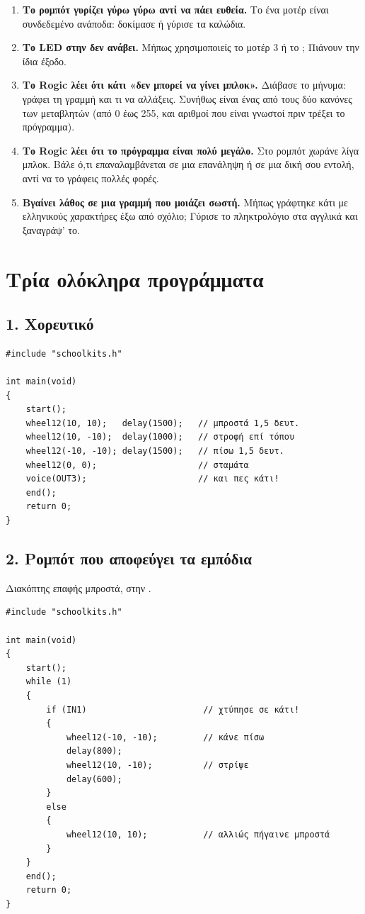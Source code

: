 \documentclass[11pt,a4paper]{article}
\newcommand{\code}[1]{\texttt{\detokenize{#1}}}
\begin{document}
\begin{enumerate}[leftmargin=1.6em, itemsep=4pt]
  \item \textbf{Το ρομπότ γυρίζει γύρω γύρω αντί να πάει ευθεία.} Το ένα μοτέρ είναι συνδεδεμένο ανάποδα:
        δοκίμασε \code{wheel12(10, -10)} ή γύρισε τα καλώδια.
  \item \textbf{Το LED στην \code{OUT1} δεν ανάβει.} Μήπως χρησιμοποιείς το μοτέρ 3 ή το \code{servo1};
        Πιάνουν την ίδια έξοδο.
  \item \textbf{Το Rogic λέει ότι κάτι «δεν μπορεί να γίνει μπλοκ».} Διάβασε το μήνυμα: γράφει τη γραμμή και τι
        να αλλάξεις. Συνήθως είναι ένας από τους δύο κανόνες των μεταβλητών (από 0 έως 255, και αριθμοί που
        είναι γνωστοί πριν τρέξει το πρόγραμμα).
  \item \textbf{Το Rogic λέει ότι το πρόγραμμα είναι πολύ μεγάλο.} Στο ρομπότ χωράνε λίγα μπλοκ. Βάλε ό,τι
        επαναλαμβάνεται σε μια επανάληψη ή σε μια δική σου εντολή, αντί να το γράφεις πολλές φορές.
  \item \textbf{Βγαίνει λάθος σε μια γραμμή που μοιάζει σωστή.} Μήπως γράφτηκε κάτι με ελληνικούς χαρακτήρες
        έξω από σχόλιο; Γύρισε το πληκτρολόγιο στα αγγλικά και ξαναγράψ' το.
\end{enumerate}

\section{Τρία ολόκληρα προγράμματα}

\subsection*{1. Χορευτικό}
\begin{lstlisting}
#include "schoolkits.h"

int main(void)
{
    start();
    wheel12(10, 10);   delay(1500);   // μπροστά 1,5 δευτ.
    wheel12(10, -10);  delay(1000);   // στροφή επί τόπου
    wheel12(-10, -10); delay(1500);   // πίσω 1,5 δευτ.
    wheel12(0, 0);                    // σταμάτα
    voice(OUT3);                      // και πες κάτι!
    end();
    return 0;
}
\end{lstlisting}

\subsection*{2. Ρομπότ που αποφεύγει τα εμπόδια}
Διακόπτης επαφής μπροστά, στην \code{IN1}.
\begin{lstlisting}
#include "schoolkits.h"

int main(void)
{
    start();
    while (1)
    {
        if (IN1)                       // χτύπησε σε κάτι!
        {
            wheel12(-10, -10);         // κάνε πίσω
            delay(800);
            wheel12(10, -10);          // στρίψε
            delay(600);
        }
        else
        {
            wheel12(10, 10);           // αλλιώς πήγαινε μπροστά
        }
    }
    end();
    return 0;
}
\end{lstlisting}
\end{document}
